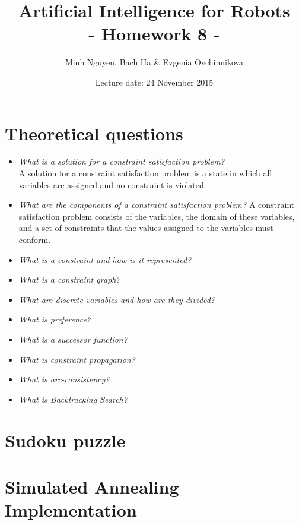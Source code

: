 \documentclass[a4paper, 12pt]{article}
\title{Artificial Intelligence for Robots \\
				- Homework 8 -}
\author{Minh Nguyen, Bach Ha \& Evgenia Ovchinnikova}
\date{Lecture date: 24 November 2015}
\begin{document}
\maketitle

\section{Theoretical questions}

    \begin{itemize}
        \item \emph{What is a solution for a constraint satisfaction problem?}\\
            A solution for a constraint satisfaction problem is a state in which
            all variables are assigned and no constraint is violated.
        \item \emph{What are the components of a constraint satisfaction problem?}
            A constraint satisfaction problem consists of the variables, the
            domain of these variables, and a set of constraints that the values
            assigned to the variables must conform.
        \item \emph{What is a constraint and how is it represented?}
        \item \emph{What is a constraint graph?}
        \item \emph{What are discrete variables and how are they divided?}
        \item \emph{What is preference?}
        \item \emph{What is a successor function?}
        \item \emph{What is constraint propagation?}
        \item \emph{What is arc-consistency?}
        \item \emph{What is Backtracking Search?}
    \end{itemize}

\section{Sudoku puzzle}


\section{Simulated Annealing Implementation}
\end{document}
